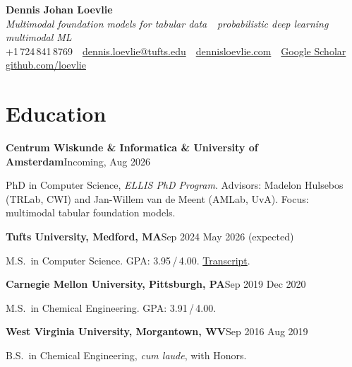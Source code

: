 \documentclass[10pt,letterpaper]{article}
\newcommand{\sansfam}{\sffamily}
\newcommand{\datestamp}[1]{{\sansfam\footnotesize\color{meta}\figureversion{lf}#1}}
\newcommand{\role}[2]{%
  \filbreak%
  \par\vspace{1pt}%
  \noindent\textbf{#1}\hfill\datestamp{#2}\par\nopagebreak}
\begin{document}
\thispagestyle{cvfirst}

\begin{center}
{\sansfam\fontsize{22pt}{26pt}\selectfont\bfseries\color{accent} Dennis Johan Loevlie}\\[2pt]
{\footnotesize\itshape\color{meta}Multimodal foundation models for tabular data \,\textperiodcentered\, probabilistic deep learning \,\textperiodcentered\, multimodal ML}\\[3pt]
{\sansfam\footnotesize\color{meta}%
+1\,724\,841\,8769 \,\textperiodcentered\,
\href{mailto:dennis.loevlie@tufts.edu}{dennis.loevlie@tufts.edu} \,\textperiodcentered\,
\href{https://www.dennisloevlie.com}{dennisloevlie.com} \,\textperiodcentered\,
\href{https://scholar.google.com/citations?user=oGkEIYkAAAAJ}{Google Scholar} \,\textperiodcentered\,
\href{https://github.com/loevlie}{github.com/loevlie}}
\end{center}
\vspace{-4pt}{\color{rule}\rule{\linewidth}{0.5pt}}

\section{Education}

\role{Centrum Wiskunde \& Informatica \& University of Amsterdam}{Incoming, Aug 2026 \textendash{}}
PhD in Computer Science, \textit{ELLIS PhD Program}. Advisors: Madelon Hulsebos (TRLab, CWI) and Jan-Willem van de Meent (AMLab, UvA). Focus: multimodal tabular foundation models.

\role{Tufts University, Medford, MA}{Sep 2024 \textendash{} May 2026 (expected)}
M.S.\ in Computer Science. GPA: 3.95\,/\,4.00. \href{https://www.loevliedl.com/static/Portfolio/PDF/SSR_TSRPT.pdf}{Transcript}.

\role{Carnegie Mellon University, Pittsburgh, PA}{Sep 2019 \textendash{} Dec 2020}
M.S.\ in Chemical Engineering. GPA: 3.91\,/\,4.00.

\role{West Virginia University, Morgantown, WV}{Sep 2016 \textendash{} Aug 2019}
B.S.\ in Chemical Engineering, \textit{cum laude}, with Honors.
\end{document}
